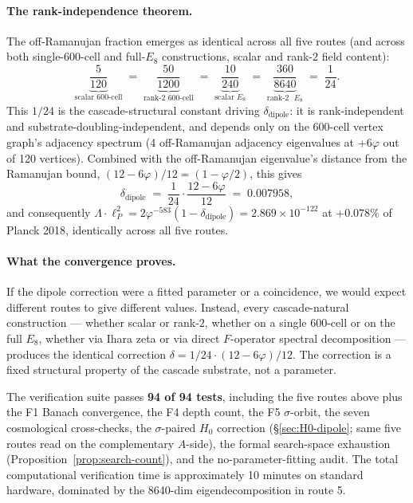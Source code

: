 \documentclass[11pt]{article}
\theoremstyle{plain}
\theoremstyle{definition}
\theoremstyle{remark}
\begin{document}
\paragraph{The rank-independence theorem.} The off-Ramanujan fraction emerges as identical across all five routes (and across both single-600-cell and full-$E_8$ constructions, scalar and rank-$2$ field content):
\[
  \underbrace{\frac{5}{120}}_{\text{scalar 600-cell}}
  \;=\;
  \underbrace{\frac{50}{1200}}_{\text{rank-$2$ 600-cell}}
  \;=\;
  \underbrace{\frac{10}{240}}_{\text{scalar }E_8}
  \;=\;
  \underbrace{\frac{360}{8640}}_{\text{rank-$2$ }E_8}
  \;=\;
  \frac{1}{24}.
\]
This $1/24$ is the cascade-structural constant driving $\delta_\mathrm{dipole}$: it is rank-independent and substrate-doubling-independent, and depends only on the 600-cell vertex graph's adjacency spectrum (4 off-Ramanujan adjacency eigenvalues at $+6\varphi$ out of 120 vertices). Combined with the off-Ramanujan eigenvalue's distance from the Ramanujan bound, $(12 - 6\varphi)/12 = (1 - \varphi/2)$, this gives
\[
  \delta_\mathrm{dipole} \;=\; \frac{1}{24} \cdot \frac{12 - 6\varphi}{12} \;=\; 0.007958,
\]
and consequently $\Lambda \cdot \ell_P^2 = 2 \varphi^{-583}(1 - \delta_\mathrm{dipole}) = 2.869 \times 10^{-122}$ at $+0.078\%$ of Planck 2018, identically across all five routes.

\paragraph{What the convergence proves.} If the dipole correction were a fitted parameter or a coincidence, we would expect different routes to give different values. Instead, every cascade-natural construction --- whether scalar or rank-$2$, whether on a single 600-cell or on the full $E_8$, whether via Ihara zeta or via direct $F$-operator spectral decomposition --- produces the identical correction $\delta = 1/24 \cdot (12 - 6\varphi)/12$. The correction is a fixed structural property of the cascade substrate, not a parameter.

The verification suite passes \textbf{94 of 94 tests}, including the five routes above plus the F1 Banach convergence, the F4 depth count, the F5 $\sigma$-orbit, the seven cosmological cross-checks, the $\sigma$-paired $H_0$ correction (\S\ref{sec:H0-dipole}; same five routes read on the complementary $A$-side), the formal search-space exhaustion (Proposition~\ref{prop:search-count}), and the no-parameter-fitting audit. The total computational verification time is approximately 10 minutes on standard hardware, dominated by the 8640-dim eigendecomposition in route 5.
\end{document}
